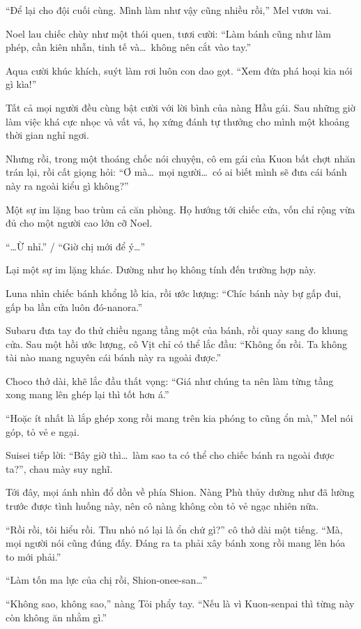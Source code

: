 \documentclass[../main.tex]{subfiles}
\begin{document}
``Để lại cho đội cuối cùng. Mình làm như vậy cũng nhiều rồi,'' Mel vươn vai.

Noel lau chiếc chùy như một thói quen, tươi cười: ``Làm bánh cũng như làm phép, cần kiên nhẫn, tinh tế và\dots\ không nên cắt vào tay.''

Aqua cười khúc khích, suýt làm rơi luôn con dao gọt. ``Xem đứa phá hoại kia nói gì kìa!''

Tất cả mọi người đều cùng bật cười với lời bình của nàng Hầu gái. Sau những giờ làm việc khá cực nhọc và vất vả, họ xứng đánh tự thưởng cho mình một khoảng thời gian nghỉ ngơi.

Nhưng rồi, trong một thoáng chốc nói chuyện, cô em gái của Kuon bất chợt nhăn trán lại, rồi cất giọng hỏi: ``Ơ mà\dots\ mọi người\dots\ có ai biết mình sẽ đưa cái bánh này ra ngoài kiểu gì không?''

Một sự im lặng bao trùm cả căn phòng. Họ hướng tới chiếc cửa, vốn chỉ rộng vừa đủ cho một người cao lớn cỡ Noel.

``\dots Ừ nhỉ.'' / ``Giờ chị mới để ý\dots''

Lại một sự im lặng khác. Dường như họ không tính đến trường hợp này.

Luna nhìn chiếc bánh khổng lồ kia, rồi ước lượng: ``Chíc bánh này bự gấp đui, gấp ba lần cửa luôn đó-nanora.''

Subaru đưa tay đo thử chiều ngang tầng một của bánh, rồi quay sang đo khung cửa. Sau một hồi ước lượng, cô Vịt chỉ có thể lắc đầu: ``Không ổn rồi. Ta không tài nào mang nguyên cái bánh này ra ngoài được.''

Choco thở dài, khẽ lắc đầu thất vọng: ``Giá như chúng ta nên làm từng tầng xong mang lên ghép lại thì tốt hơn á.''

``Hoặc ít nhất là lắp ghép xong rồi mang trên kia phóng to cũng ổn mà,'' Mel nói góp, tỏ vẻ e ngại.

Suisei tiếp lời: ``Bây giờ thì\dots\ làm sao ta có thể cho chiếc bánh ra ngoài được ta?'', chau mày suy nghĩ.

Tới đây, mọi ánh nhìn đổ dồn về phía Shion. Nàng Phù thủy dường như đã lường trước được tình huống này, nên cô nàng không còn tỏ vẻ ngạc nhiên nữa.

``Rồi rồi, tôi hiểu rồi. Thu nhỏ nó lại là ổn chứ gì?'' cô thở dài một tiếng. ``Mà, mọi người nói cũng đúng đấy. Đáng ra ta phải xây bánh xong rồi mang lên hóa to mới phải.''

``Làm tốn ma lực của chị rồi, Shion-onee-san\dots''

``Không sao, không sao,'' nàng Tỏi phẩy tay. ``Nếu là vì Kuon-senpai thì từng này còn không ăn nhằm gì.''
\end{document}
